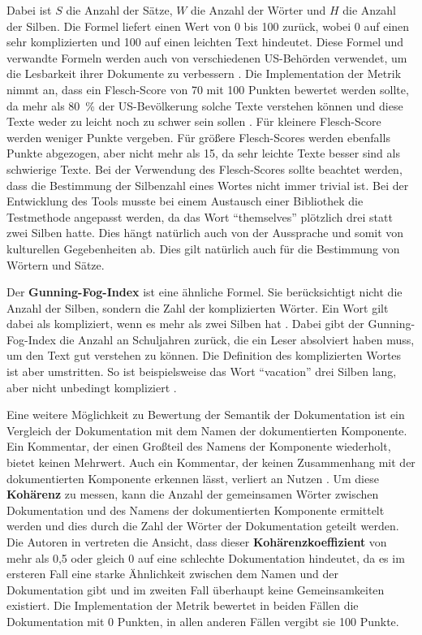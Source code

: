 Dabei ist $S$ die Anzahl der Sätze, $W$ die Anzahl der Wörter und $H$ die Anzahl der Silben. Die Formel liefert einen Wert von 0 bis 100 zurück, wobei 0 auf einen sehr komplizierten und 100 auf einen leichten Text hindeutet. Diese Formel und verwandte Formeln werden auch von verschiedenen US-Behörden verwendet, um die Lesbarkeit ihrer Dokumente zu verbessern \cite[S.~72]{AutomaticQualityAssessmentofSourceCodeComments:TheJavadocMiner}. Die Implementation der Metrik nimmt an, dass ein Flesch-Score von 70 mit 100 Punkten bewertet werden sollte, da mehr als 80~\% der US-Bevölkerung solche Texte verstehen können und diese Texte weder zu leicht noch zu schwer sein sollen \cite[S.~22]{ThePrinciplesofReadability}. Für kleinere Flesch-Score werden weniger Punkte vergeben. Für größere Flesch-Scores werden ebenfalls Punkte abgezogen, aber nicht mehr als 15, da sehr leichte Texte besser sind als schwierige Texte. 
Bei der Verwendung des Flesch-Scores sollte beachtet werden, dass die Bestimmung der Silbenzahl eines Wortes nicht immer trivial ist. Bei der Entwicklung des Tools musste bei einem Austausch einer Bibliothek die Testmethode angepasst werden, da das Wort \enquote{themselves} plötzlich drei statt zwei Silben hatte. Dies hängt natürlich auch von der Aussprache und somit von kulturellen Gegebenheiten ab. Dies gilt natürlich auch für die Bestimmung von Wörtern und Sätze. 

Der \textbf{Gunning-Fog-Index} ist eine ähnliche Formel. Sie berücksichtigt nicht die Anzahl der Silben, sondern die Zahl der komplizierten Wörter. Ein Wort gilt dabei als kompliziert, wenn es mehr als zwei Silben hat \cite[S. 24]{ThePrinciplesofReadability}. Dabei gibt der Gunning-Fog-Index die Anzahl an Schuljahren zurück, die ein Leser absolviert haben muss, um den Text gut verstehen zu können. Die Definition des komplizierten Wortes ist aber umstritten. So ist beispielsweise das Wort \enquote{vacation} drei Silben lang, aber nicht unbedingt kompliziert \cite[S.~10]{bogert1985defense}.

\bigskip
Eine weitere Möglichkeit zu Bewertung der Semantik der Dokumentation ist ein Vergleich der Dokumentation mit dem Namen der dokumentierten Komponente. Ein Kommentar, der einen Großteil des Namens der Komponente wiederholt, bietet keinen Mehrwert. Auch ein Kommentar, der keinen Zusammenhang mit der dokumentierten Komponente erkennen lässt, verliert an Nutzen \cite[S.~86]{Qualityanalysisofsourcecodecomments}.
Um diese \textbf{Kohärenz} zu messen, kann die Anzahl der gemeinsamen Wörter zwischen Dokumentation und des Namens der dokumentierten Komponente ermittelt werden und dies durch die Zahl der Wörter der Dokumentation geteilt werden. Die Autoren in \cite[S.~87]{Qualityanalysisofsourcecodecomments} vertreten die Ansicht, dass dieser \textbf{Kohärenzkoeffizient} von mehr als 0,5 oder gleich 0 auf eine schlechte Dokumentation hindeutet, da es im ersteren Fall eine starke Ähnlichkeit zwischen dem Namen und der Dokumentation gibt und im zweiten Fall überhaupt keine Gemeinsamkeiten existiert. Die Implementation der Metrik bewertet in beiden Fällen die Dokumentation mit 0 Punkten, in allen anderen Fällen vergibt sie 100 Punkte.

